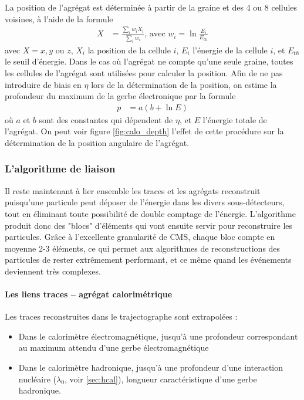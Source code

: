 \medskip

La position de l'agrégat est déterminée à partir de la graine et des 4 ou 8 cellules voisines, à l'aide de la formule
\begin{align*}
  X &= \frac{ \sum_i{w_i X_i} }{ \sum_i{w_i} }\text{, avec } w_i = \ln{\frac{E_i}{E_{th}}}
\end{align*}
avec $X = x, y$ ou $z$, $X_i$ la position de la cellule $i$, $E_i$ l'énergie de la cellule $i$, et $E_{th}$ le seuil d'énergie. Dans le cas où l'agrégat ne compte qu'une seule graine, toutes les cellules de l'agrégat sont utilisées pour calculer la position. Afin de ne pas introduire de biais en $\eta$ lors de la détermination de la position, on estime la profondeur du maximum de la gerbe électronique par la formule
\begin{align*}
  p &= a\left( b + \ln{E} \right)
\end{align*}
où $a$ et $b$ sont des constantes qui dépendent de $\eta$, et $E$ l'énergie totale de l'agrégat. On peut voir figure \ref{fig:calo_depth} l'effet de cette procédure sur la détermination de la position angulaire de l'agrégat.

\subsubsection{L'algorithme de liaison} \label{sec:pf_links}

Il reste maintenant à lier ensemble les traces et les agrégats reconstruit puisqu'une particule peut déposer de l'énergie dans les divers sous-détecteurs, tout en éliminant toute possibilité de double comptage de l'énergie. L'algorithme produit donc des "blocs" d'éléments qui vont ensuite servir pour reconstruire les particules. Grâce à l'excellente granularité de CMS, chaque bloc compte en moyenne 2-3 éléments, ce qui permet aux algorithmes de reconstructions des particules de rester extrêmement performant, et ce même quand les événements deviennent très complexes.

\paragraph{Les liens traces – agrégat calorimétrique}

Les traces reconstruites dans le trajectographe sont extrapolées :
\begin{itemize}
  \item Dans le calorimètre électromagnétique, jusqu'à une profondeur correspondant au maximum attendu d'une gerbe électromagnétique
  \item Dans le calorimètre hadronique, jusqu'à une profondeur d'une interaction nucléaire ($\lambda_0$, voir \cref{sec:hcal}), longueur caractéristique d'une gerbe hadronique.
\end{itemize}


